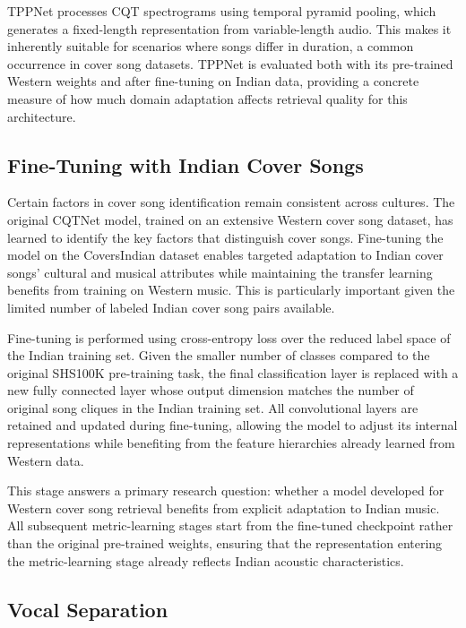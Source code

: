 \documentclass[conference]{IEEEtran}
\begin{document}
TPPNet processes CQT spectrograms using temporal pyramid pooling, which generates a fixed-length representation from variable-length audio. This makes it inherently suitable for scenarios where songs differ in duration, a common occurrence in cover song datasets. TPPNet is evaluated both with its pre-trained Western weights and after fine-tuning on Indian data, providing a concrete measure of how much domain adaptation affects retrieval quality for this architecture.

\subsection{Fine-Tuning with Indian Cover Songs}

Certain factors in cover song identification remain consistent across cultures. The original CQTNet model, trained on an extensive Western cover song dataset, has learned to identify the key factors that distinguish cover songs. Fine-tuning the model on the CoversIndian dataset enables targeted adaptation to Indian cover songs' cultural and musical attributes while maintaining the transfer learning benefits from training on Western music. This is particularly important given the limited number of labeled Indian cover song pairs available.

Fine-tuning is performed using cross-entropy loss over the reduced label space of the Indian training set. Given the smaller number of classes compared to the original SHS100K pre-training task, the final classification layer is replaced with a new fully connected layer whose output dimension matches the number of original song cliques in the Indian training set. All convolutional layers are retained and updated during fine-tuning, allowing the model to adjust its internal representations while benefiting from the feature hierarchies already learned from Western data.

This stage answers a primary research question: whether a model developed for Western cover song retrieval benefits from explicit adaptation to Indian music. All subsequent metric-learning stages start from the fine-tuned checkpoint rather than the original pre-trained weights, ensuring that the representation entering the metric-learning stage already reflects Indian acoustic characteristics.

\subsection{Vocal Separation}
\end{document}
